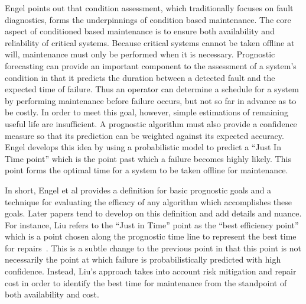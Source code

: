 \documentclass[12pt]{article}
\begin{document}
Engel points out that condition assessment, which traditionally focuses on
fault diagnostics, forms the underpinnings of condition based maintenance.  The
core aspect of conditioned based maintenance is to ensure both availability
and reliability of critical systems.  Because critical systems cannot be taken
offline at will, maintenance must only be performed when it is necessary.
Prognostic forecasting can provide an important component to the assessment of a
system's condition in that it predicts the duration between a detected fault
and the expected time of failure.  Thus an operator can determine a schedule
for a system by performing maintenance before failure occurs, but not so far in
advance as to be costly.  In order to meet this goal, however, simple
estimations of remaining useful life are insufficient.  A prognostic algorithm
must also provide a confidence measure so that its prediction can be
weighted against its expected accuracy.  Engel develops this idea by using a
probabilistic model to predict a ``Just In Time point'' which is the point
past which a failure becomes highly likely.  This point forms the optimal time
for a system to be taken offline for maintenance.  

In short, Engel et al provides a definition for basic prognostic goals and a
technique for evaluating the efficacy of any algorithm which accomplishes these
goals.  Later papers tend to develop on this definition and add details and
nuance.  For instance, Liu refers to the ``Just in Time'' point as the ``best
efficiency point'' which is a point chosen along the prognostic time line to
represent the best time for repairs~\cite{4585821}.  This is a subtle change to
the previous point in that this point is not necessarily the point at which
failure is probabilistically predicted with high confidence.  Instead, Liu's
approach takes into account risk mitigation and repair cost in order to identify
the best time for maintenance from the standpoint of both availability and cost.
\end{document}
